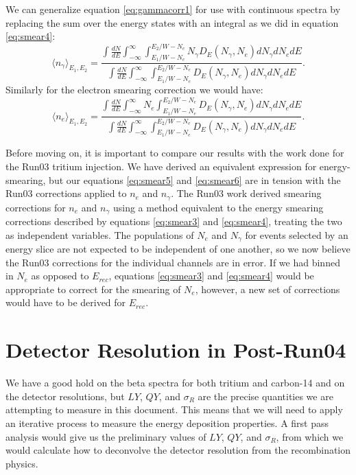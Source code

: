 We can generalize equation \ref{eq:gammacorr1} for use with continuous spectra by replacing the sum over the energy states with an integral as we did in equation \ref{eq:smear4}:
\begin{equation}\label{eq:smear5}
\langle n_{\gamma} \rangle_{E_1,E_2}=\frac{\int \frac{dN}{dE} \int_{-\infty}^{\infty} \int_{E_1/W-N_e}^{E_2/W-N_e} N_{\gamma} D_{E}(N_{\gamma},N_{e})dN_{\gamma}dN_{e}dE}{\int \frac{dN}{dE} \int_{-\infty}^{\infty} \int_{E_1/W-N_e}^{E_2/W-N_e} D_{E}(N_{\gamma},N_{e})dN_{\gamma}dN_{e}dE}.
\end{equation}
Similarly for the electron smearing correction we would have:
\begin{equation}\label{eq:smear6}
\langle n_e \rangle_{E_1,E_2}=\frac{\int \frac{dN}{dE} \int_{-\infty}^{\infty}N_{e}  \int_{E_1/W-N_e}^{E_2/W-N_e} D_{E}(N_{\gamma},N_{e})dN_{\gamma}dN_{e}dE}{\int \frac{dN}{dE} \int_{-\infty}^{\infty} \int_{E_1/W-N_e}^{E_2/W-N_e} D_{E}(N_{\gamma},N_{e})dN_{\gamma}dN_{e}dE}.
\end{equation}

Before moving on, it is important to compare our results with the work done for the Run03 tritium injection\cite{lux_tritium,attila}. We have derived an equivalent expression for energy-smearing, but our equations \ref{eq:smear5} and \ref{eq:smear6} are in tension with the Run03 corrections applied to $n_e$ and $n_{\gamma}$.  The Run03 work derived smearing corrections for $n_e$ and $n_{\gamma}$ using a method equivalent to the energy smearing corrections described by equations \ref{eq:smear3} and \ref{eq:smear4}, treating the two as independent variables. The populations of $N_e$ and $N_{\gamma}$ for events selected by an energy slice are not expected to be independent of one another, so we now believe the Run03 corrections for the individual channels are in error. If we had binned in $N_{e}$ as opposed to $E_{rec}$, equations \ref{eq:smear3} and \ref{eq:smear4} would be appropriate to correct for the smearing of  $N_{e}$, however, a new set of corrections would have to be derived for $E_{rec}$.



\section{Detector Resolution in Post-Run04}
We have a good hold on the beta spectra for both tritium and carbon-14 and on the detector resolutions, but $LY$, $QY$, and $\sigma_R$ are the precise quantities we are attempting to measure in this document. This means that we will need to apply an iterative process to measure the energy deposition properties. A first pass analysis would give us the preliminary values of $LY$, $QY$, and $\sigma_R$, from which we would calculate how to deconvolve the detector resolution from the recombination physics.

